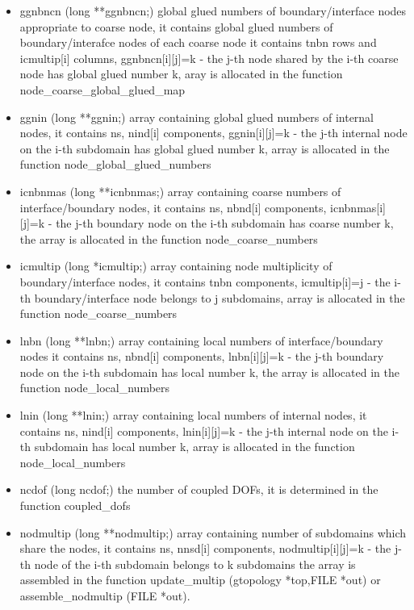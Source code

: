 \begin{itemize}
\item
{\sf ggnbncn (long **ggnbncn;)} global glued numbers of boundary/interface nodes appropriate to coarse node,
it contains global glued numbers of boundary/interafce nodes of each coarse node
it contains {\sf tnbn} rows and {\sf icmultip[i]} columns,
{\sf ggnbncn[i][j]=k} - the j-th node shared by the i-th coarse node has global glued number k,
aray is allocated in the function {\sf node\_coarse\_global\_glued\_map}
  
\item
{\sf ggnin (long **ggnin;)} array containing global glued numbers of internal nodes,
it contains {\sf ns, nind[i]} components,
{\sf ggnin[i][j]=k} - the j-th internal node on the i-th subdomain has global glued number k,
array is allocated in the function {\sf node\_global\_glued\_numbers}

\item
{\sf icnbnmas (long **icnbnmas;)} array containing coarse numbers of interface/boundary nodes,
it contains {\sf ns, nbnd[i]} components,
{\sf icnbnmas[i][j]=k} - the j-th boundary node on the i-th subdomain has coarse number k,
the array is allocated in the function {\sf node\_coarse\_numbers}

\item
{\sf icmultip (long *icmultip;)} array containing node multiplicity of boundary/interface nodes,
it contains {\sf tnbn} components,
{\sf icmultip[i]=j} - the i-th boundary/interface node belongs to j subdomains,
array is allocated in the function {\sf node\_coarse\_numbers}

\item
{\sf lnbn (long **lnbn;)} array containing local numbers of interface/boundary nodes
it contains {\sf ns, nbnd[i]} components,
{\sf lnbn[i][j]=k} - the j-th boundary node on the i-th subdomain has local number k,
the array is allocated in the function {\sf node\_local\_numbers}

\item
{\sf lnin (long **lnin;)} array containing local numbers of internal nodes,
it contains {\sf ns, nind[i]} components,
{\sf lnin[i][j]=k} - the j-th internal node on the i-th subdomain has local number k,
array is allocated in the function {\sf node\_local\_numbers}

\item
{\sf ncdof (long ncdof;)} the number of coupled DOFs,
it is determined in the function {\sf coupled\_dofs}

\item
{\sf nodmultip (long **nodmultip;)} array containing number of subdomains which share the nodes,
it contains {\sf ns, nnsd[i]} components,
{\sf nodmultip[i][j]=k} - the j-th node of the i-th subdomain belongs to k subdomains
the array is assembled in the function {\sf update\_multip (gtopology *top,FILE *out)}
or {\sf assemble\_nodmultip (FILE *out)}.
 

\end{itemize}
